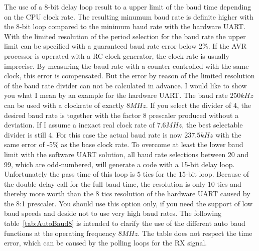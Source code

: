 The use of a 8-bit delay loop result to a upper limit of the baud time
depending on the CPU clock rate.
The resulting minumum baud rate is definite higher with the 8-bit loop
compared to the minimum baud rate with the hardware UART.
With the limited resolution of the period selection for the baud rate
the upper limit can be specified with a guaranteed baud rate error below 2\%.
If the AVR processor is operated with a RC clock generator, the clock rate
is usually imprecise. By measuring the baud rate with a counter controlled
with the same clock, this error is compensated.
But the error by reason of the limited resolution of the baud rate divider 
can not be calculated in advance.
I would like to show you what I mean by an example for the hardware UART. 
The baud rate \(250kHz\) can be used with a clockrate of exactly \(8MHz\).
If you select the divider of 4, the desired baud rate is together with
the factor 8 prescaler produced without a deviation.
If I assume a inexact real clock rate of \(7.6MHz\),
the best selectable divider is still 4.
For this case the actual baud rate is now \(237.5kHz\) with the same
error of -5\% as the base clock rate.
To overcome at least the lower baud limit with the software UART solution,
all baud rate selections between 20 and 99, which are odd-numbered,
will generate a code with a 15-bit delay loop.
Unfortunately the pass time of this loop is 5 tics for the 15-bit loop.
Because of the double delay call for the full baud time,
the resolution is only 10 tics and thereby more worth than the 
8 tics resolution of the hardware UART caused by the 8:1 prescaler.
You should use this option only, if you need the support of low baud speeds
and deside not to use very high baud rates.
The following table~\ref{tab:AutoBaud8} is intended to clarify the use of
the different auto baud functions at the operating frequency \(8MHz\).
The table does not respect the time error, which can be caused by the
polling loops for the RX signal.

